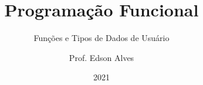 \title{Programação Funcional}
\subtitle{Funções e Tipos de Dados de Usuário}
\date{2021}
\author{Prof. Edson Alves}
